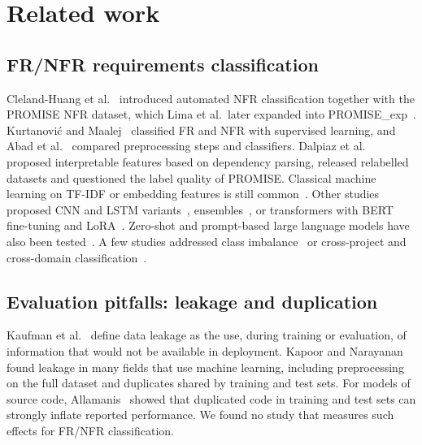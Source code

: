 \section{Related work}
\label{sec:related}

\subsection{FR/NFR requirements classification}

Cleland-Huang et al.~\cite{clelandhuang2007} introduced automated NFR classification together with the PROMISE NFR dataset, which Lima et al.\ later expanded into PROMISE\_exp~\cite{lima2019}. Kurtanovi\'c and Maalej~\cite{kurtanovic2017} classified FR and NFR with supervised learning, and Abad et al.~\cite{abad2017what} compared preprocessing steps and classifiers. Dalpiaz et al.~\cite{dalpiaz2019} proposed interpretable features based on dependency parsing, released relabelled datasets and questioned the label quality of PROMISE. Classical machine learning on TF-IDF or embedding features is still common~\cite{toth2019comparative,younas2019automated,baskoro2021systematic,rahman2023functional}. Other studies proposed CNN and LSTM variants~\cite{rahimi2021phase,metu2024hybrid,khayashi2026deep,kadhim2026enhancing}, ensembles~\cite{rahimi2020ensemble,abbas2024classification,kiani2026deep}, or transformers with BERT fine-tuning and LoRA~\cite{hey2020norbert,eltahier2025bert,li2025study}. Zero-shot and prompt-based large language models have also been tested~\cite{alhoshan2023zero,binkhonain2025prompts,martin2025evaluating}. A few studies addressed class imbalance~\cite{or2025improving} or cross-project and cross-domain classification~\cite{tahir2025cross,ali2025multi}.

\subsection{Evaluation pitfalls: leakage and duplication}

Kaufman et al.~\cite{kaufman2012} define data leakage as the use, during training or evaluation, of information that would not be available in deployment. Kapoor and Narayanan~\cite{kapoor2023} found leakage in many fields that use machine learning, including preprocessing on the full dataset and duplicates shared by training and test sets. For models of source code, Allamanis~\cite{allamanis2019adverse} showed that duplicated code in training and test sets can strongly inflate reported performance. We found no study that measures such effects for FR/NFR classification.

